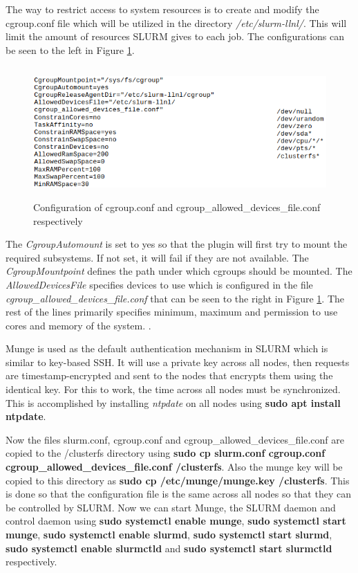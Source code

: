 \documentclass[../Head/Report.tex]{subfiles}
\begin{document}
The way to restrict access to system resources is to create and modify the cgroup.conf file which will be utilized in the directory \textit{/etc/slurm-llnl/}. This will limit the amount of resources SLURM gives to each job. The configurations can be seen to the left in Figure \ref{fig:created_files}.     

\begin{figure}[H]
	\centering
	\includegraphics[height=5cm]{../Figures/created_files.png}
    \caption{Configuration of cgroup.conf and cgroup\_allowed\_devices\_file.conf respectively}
    \label{fig:created_files}
\end{figure}

The \textit{CgroupAutomount} is set to yes so that the plugin will first try to mount the required subsystems. If not set, it will fail if they are not available. The \textit{CgroupMountpoint} defines the path under which cgroups should be mounted. The \textit{AllowedDevicesFile} specifies devices to use which is configured in the file \textit{cgroup\_allowed\_devices\_file.conf} that can be seen to the right in Figure \ref{fig:created_files}. The rest of the lines primarily specifies minimum, maximum and permission to use cores and memory of the system. \cite{cgroups} \cite{piCluster}. 

Munge is used as the default authentication mechanism in SLURM which is similar to key-based SSH. It will use a private key across all nodes, then requests are timestamp-encrypted and sent to the nodes that encrypts them using the identical key. For this to work, the time across all nodes must be synchronized. This is accomplished by installing \textit{ntpdate} on all nodes using \textbf{sudo apt install ntpdate}. 

Now the files slurm.conf, cgroup.conf and cgroup\_allowed\_devices\_file.conf are copied to the /clusterfs directory using \textbf{sudo cp slurm.conf cgroup.conf cgroup\_allowed\_devices\_file.conf /clusterfs}. Also the munge key will be copied to this directory as \textbf{sudo cp /etc/munge/munge.key /clusterfs}. This is done so that the configuration file is the same across all nodes so that they can be controlled by SLURM. Now we can start Munge, the SLURM daemon and control daemon using \textbf{sudo systemctl enable munge}, \textbf{sudo systemctl start munge}, \textbf{sudo systemctl enable slurmd}, \textbf{sudo systemctl start slurmd}, \textbf{sudo systemctl enable slurmctld} and \textbf{sudo systemctl start slurmctld} respectively.
\end{document}
